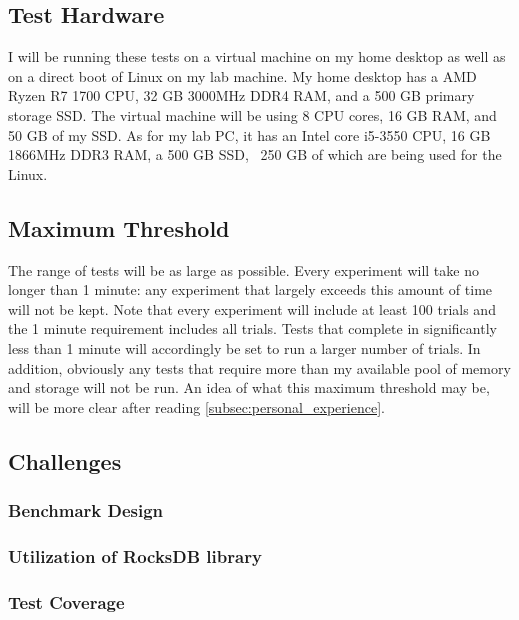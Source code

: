 \documentclass[twocolumn,11pt]{article}
\begin{document}
\subsection{Test Hardware}
\label{subsec:test_hw}

I will be running these tests on a virtual machine on my home desktop as well as
on a direct boot of Linux on my lab machine. My home desktop has a AMD Ryzen R7
1700 CPU, 32 GB 3000MHz DDR4 RAM, and a 500 GB primary storage SSD. The virtual
machine will be using 8 CPU cores, 16 GB RAM, and 50 GB of my SSD. As for my lab
PC, it has an Intel core i5-3550 CPU, 16 GB 1866MHz DDR3 RAM, a 500 GB SSD, ~250
GB of which are being used for the Linux.

\subsection{Maximum Threshold}
\label{subsec:max_threshold}

The range of tests will be as large as possible. Every experiment will take no
longer than 1 minute: any experiment that largely exceeds this amount of time
will not be kept. Note that every experiment will include at least 100 trials
and the 1 minute requirement includes all trials. Tests that complete in
significantly less than 1 minute will accordingly be set to run a larger number
of trials. In addition, obviously any tests that require more than my available
pool of memory and storage will not be run. An idea of what this maximum
threshold may be, will be more clear after reading
\ref{subsec:personal_experience}.

\subsection{Challenges}

\subsubsection{Benchmark Design}

\subsubsection{Utilization of RocksDB library}

\subsubsection{Test Coverage}
\end{document}
